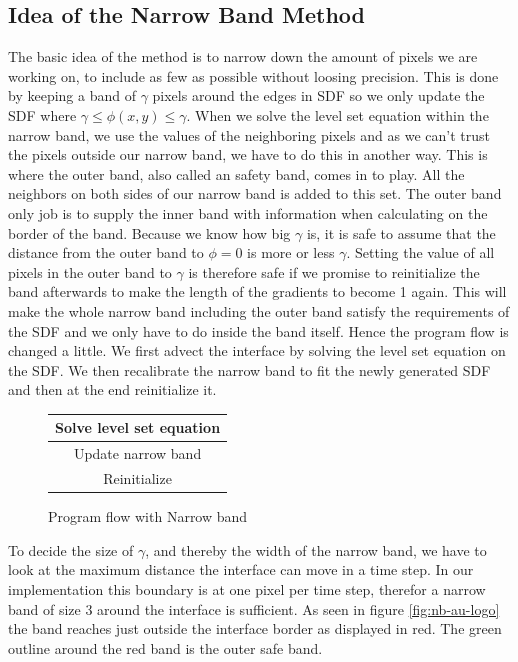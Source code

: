 \subsection*{Idea of the Narrow Band Method}
The basic idea of the method is to narrow down the amount of pixels we
are working on, to include as few as possible without loosing
precision. This is done by keeping a band of $\gamma$ pixels around
the edges in SDF so we only update the SDF where
$\gamma \leq \phi(x,y) \leq \gamma$. When we solve the level set
equation within the narrow band, we use the values of the neighboring
pixels and as we can't trust the pixels outside our narrow band, we
have to do this in another way. This is where the outer band, also
called an safety band, comes in to play. All the neighbors on both
sides of our narrow band is added to this set. The outer band only job
is to supply the inner band with information when calculating on the
border of the band. Because we know how big $\gamma$ is, it is safe to
assume that the distance from the outer band to $\phi=0$ is more or
less $\gamma$. Setting the value of all pixels in the outer band to
$\gamma$ is therefore safe if we promise to reinitialize the band
afterwards to make the length of the gradients to become 1 again. This
will make the whole narrow band including the outer band satisfy the
requirements of the SDF and we only have to do inside the band
itself. Hence the program flow is changed a little. We first advect
the interface by solving the level set equation on the SDF. We then
recalibrate the narrow band to fit the newly generated SDF and
then at the end reinitialize it.


\begin{figure}[!ht]
  \centering
  \begin{tabular}{ | c | }
   \hline			
   Solve level set equation \\
   \hline
   Update narrow band \\
   \hline   
   Reinitialize \\
   \hline  
  \end{tabular}
  \caption{Program flow with Narrow band}
  \label{fig:narrowband_flow}
\end{figure}


To decide the size of $\gamma$, and thereby the width of the narrow
band, we have to look at the maximum distance the interface can move
in a time step. In our implementation this boundary is at one pixel
per time step, therefor a narrow band of size 3 around the interface
is sufficient. As seen in figure \vref{fig:nb-au-logo} the band
reaches just outside the interface border as displayed in red. The
green outline around the red band is the outer safe band.

